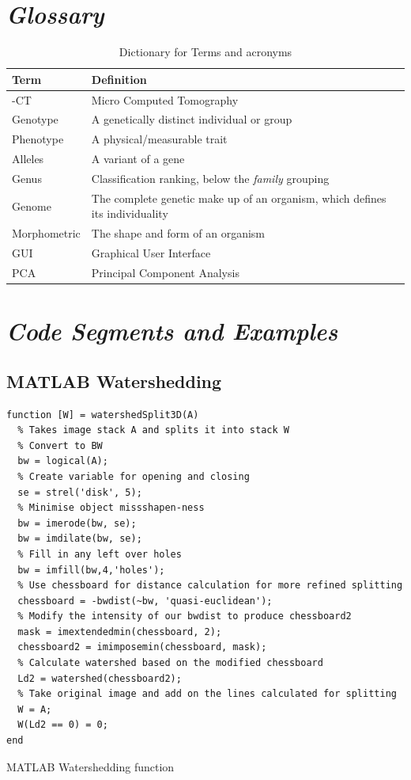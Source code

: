 \documentclass[11pt]{report}
\begin{document}
\section{\emph{Glossary}}
\label{sec-7-2}
\begin{table}[htb]
\caption{\label{tab:glossary}Dictionary for Terms and acronyms}
\centering
\begin{tabularx}{\textwidth}{|l|X|}
\hline
\textbf{Term} & \textbf{Definition}\\
\hline
\textmu{}-CT & Micro Computed Tomography\\
\hline
Genotype & A genetically distinct individual or group\\
\hline
Phenotype & A physical/measurable trait\\
\hline
Alleles & A variant of a gene\\
\hline
Genus & Classification ranking, below the \emph{family} grouping\\
\hline
Genome & The complete genetic make up of an organism, which defines its individuality\\
\hline
Morphometric & The shape and form of an organism\\
\hline
GUI & Graphical User Interface\\
\hline
PCA & Principal Component Analysis\\
\hline
\end{tabularx}
\end{table}


\section{\emph{Code Segments and Examples}}
\label{sec-7-3}
\subsection{MATLAB Watershedding}
\label{sec-7-3-1}

\begin{listing}[H]
\begin{verbatim}
function [W] = watershedSplit3D(A)
  % Takes image stack A and splits it into stack W
  % Convert to BW
  bw = logical(A);
  % Create variable for opening and closing
  se = strel('disk', 5);
  % Minimise object missshapen-ness
  bw = imerode(bw, se);
  bw = imdilate(bw, se);
  % Fill in any left over holes
  bw = imfill(bw,4,'holes');
  % Use chessboard for distance calculation for more refined splitting
  chessboard = -bwdist(~bw, 'quasi-euclidean');
  % Modify the intensity of our bwdist to produce chessboard2
  mask = imextendedmin(chessboard, 2);
  chessboard2 = imimposemin(chessboard, mask);
  % Calculate watershed based on the modified chessboard
  Ld2 = watershed(chessboard2);
  % Take original image and add on the lines calculated for splitting
  W = A;
  W(Ld2 == 0) = 0;
end
\end{verbatim}
\caption{\label{lst:ws}MATLAB Watershedding function}
\end{listing}
\end{document}
